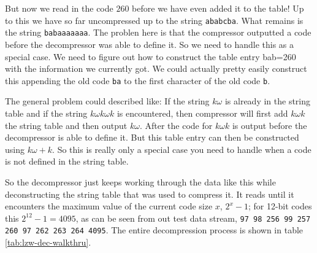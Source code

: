 \begin{refsection}
But now we read in the code $260$ before we have even added it to the
table! Up to this we have so far uncompressed up to the string
\texttt{ababcba}. What remains is the string \texttt{babaaaaaaa}. The
problen here is that the compressor outputted a code before the
decompressor was able to define it. So we need to handle this as a
special case. We need to figure out how to construct the table entry
bab=260 with the information we currently got. We could actually
pretty easily construct this appending the old code \texttt{ba} to the
first character of the old code \texttt{b}.

\newcommand{\ko}{\ensuremath{k\omega}\xspace}
\newcommand{\kok}{\ensuremath{\ko k}\xspace}
\newcommand{\kokok}{\ensuremath{\kok \omega k}\xspace}

The general problem could described like: If the string \ko is already
in the string table and if the string \kokok is encountered, then
compressor will first add \kok the string table and then output
\ko. After the code for \kok is output before the decompressor is able
to define it. But this table entry can then be constructed using $\ko
+k$.  So this is really only a special case you need to handle when a
code is not defined in the string table.

So the decompressor just keeps working through the data like this while
deconstructing the string table that was used to compress it. It reads
until it encounters the maximum value of the current code size $x$,
$2^{x}-1$; for 12-bit codes this $2^{12} - 1 = 4095$, as can be seen
from out test data stream, \texttt{97 98 256 99 257 260 97 262 263 264
  4095}. The entire decompression process is shown in table \ref{tab:lzw-dec-walkthru}.

\begin{table}
  \centering
  \noindent{}
\end{table}
\end{refsection}
